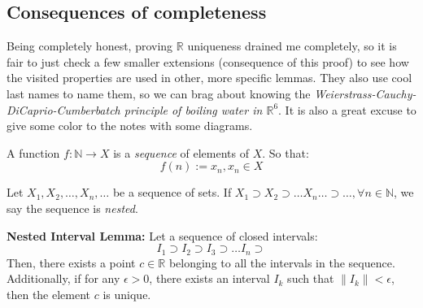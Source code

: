 \newpage
\subsection{Consequences of completeness}

Being completely honest, proving $\mathbb{R}$ uniqueness drained me completely, so it is fair to just check a few smaller extensions (consequence of this proof) to see how the visited properties are used in other, more specific lemmas. They also use cool last names to name them, so we can brag about knowing the \textit{Weierstrass-Cauchy-DiCaprio-Cumberbatch principle of boiling water in $\mathbb{R}^6$}. It is also a great excuse to give some color to the notes with some diagrams.

\begin{definition}
A function $f: \mathbb{N} \rightarrow X$ is a \textit{sequence} of elements of $X$.
So that:
$$f(n) := x_n, x_n \in X$$
\end{definition}

\begin{definition}
Let $X_1, X_2, \dots, X_n, \dots$ be a sequence of sets. If $X_1 \supset X_2 \supset \dots X_n \dots \supset \dots, \forall n \in \mathbb{N}$, we say the sequence is \textit{nested}.
\end{definition}

\begin{lemma}\label{le:cauchy-cantor}
\textbf{Nested Interval Lemma:}
Let a sequence of closed intervals:
$$
I_1 \supset I_2 \supset I_3 \supset \dots I_n \supset
$$
Then, there exists a point $c \in \mathbb{R}$ belonging to all the intervals in the sequence.
Additionally, if for any $\epsilon > 0$, there exists an interval $I_k$ such that $\left\lVert I_k \right\rVert < \epsilon$, then the element $c$ is unique.
\end{lemma}


